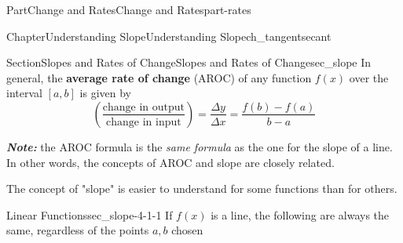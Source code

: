 \documentclass{tufte-book}
\newcommand{\alert}[1]{\textbf{\textit{#1}}}
\newcommand{\terminology}[1]{\textbf{#1}}
\numberwithin{equation}{chapter}
\begin{document}
\begin{partptx}{Part}{Change and Rates}{}{Change and Rates}{}{}{part-rates}
\begin{chapterptx}{Chapter}{Understanding Slope}{}{Understanding Slope}{}{}{ch_tangentsecant}
\begin{introduction}{}
\begin{image}{0}{1}{0}{}
{
}%
\end{image}%
\end{introduction}%
%
%
\typeout{************************************************}
\typeout{************************************************}
%
\begin{sectionptx}{Section}{Slopes and Rates of Change}{}{Slopes and Rates of Change}{}{}{sec_slope}
In general, the \terminology{average rate of change} (AROC) of any function \(f(x)\) over the interval \([a,b]\) is given by%
\begin{equation*}
\left(\dfrac{\text{change in output}}{\text{change in input}}\right) = \dfrac{\Delta y}{\Delta x} = \dfrac{f(b)-f(a)}{b-a}
\end{equation*}
%
\par
\alert{Note:} the AROC formula is the \emph{same formula} as the one for the slope of a line. In other words, the concepts of AROC and slope are closely related.%
\par
The concept of "slope" is easier to understand for some functions than for others.%
\begin{descriptionlist}
\begin{dlimedium}{Linear Functions}{sec_slope-4-1-1}%
If \(f(x)\) is a line, the following are always the same, regardless of the points \(a,b\) chosen%

\end{dlimedium}
\end{descriptionlist}
\end{sectionptx}
\end{chapterptx}
\end{partptx}
\end{document}
